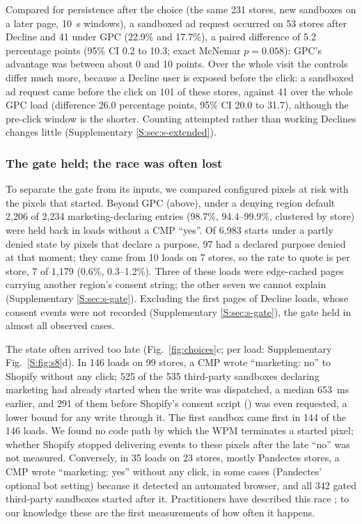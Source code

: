 Compared for persistence after the choice (the same 231 stores, new sandboxes on a later page, 10~s windows), a sandboxed ad request occurred on 53 stores after Decline and 41 under GPC (22.9\% and 17.7\%), a paired difference of 5.2 percentage points (95\% CI 0.2 to 10.3; exact McNemar $p=0.058$): GPC's advantage was between about 0 and 10 points. Over the whole visit the controls differ much more, because a Decline user is exposed before the click: a sandboxed ad request came before the click on 101 of these stores, against 41 over the whole GPC load (difference 26.0 percentage points, 95\% CI 20.0 to 31.7), although the pre-click window is the shorter. Counting attempted rather than working Declines changes little (Supplementary \ref*{S:sec:s-extended}).

\subsubsection{The gate held; the race was often lost}\label{sec:res-race}

To separate the gate from its inputs, we compared configured pixels at risk with the pixels that started. Beyond GPC (above), under a denying region default 2,206 of 2,234 marketing-declaring entries (98.7\%, 94.4--99.9\%, clustered by store) were held back in loads without a CMP ``yes''. Of 6,983 starts under a partly denied state by pixels that declare a purpose, 97 had a declared purpose denied at that moment; they came from 10 loads on 7 stores, so the rate to quote is per store, 7 of 1,179 (0.6\%, 0.3--1.2\%). Three of these loads were edge-cached pages carrying another region's consent string; the other seven we cannot explain (Supplementary \ref*{S:sec:s-gate}). Excluding the first pages of Decline loads, whose consent events were not recorded (Supplementary \ref*{S:sec:s-gate}), the gate held in almost all observed cases.

The state often arrived too late (Fig.~\ref{fig:choices}c; per load: Supplementary Fig.~\ref*{S:fig:s8}d). In 146 loads on 99 stores, a CMP wrote ``marketing: no'' to Shopify without any click; 525 of the 535 third-party sandboxes declaring marketing had already started when the write was dispatched, a median 653~ms earlier, and 291 of them before Shopify's consent script () was even requested, a lower bound for any write through it. The first sandbox came first in 144 of the 146 loads. We found no code path by which the WPM terminates a started pixel; whether Shopify stopped delivering events to these pixels after the late ``no'' was not measured. Conversely, in 35 loads on 23 stores, mostly Pandectes stores, a CMP wrote ``marketing: yes'' without any click, in some cases (Pandectes' optional bot setting) because it detected an automated browser, and all 342 gated third-party sandboxes started after it. Practitioners have described this race \citep{analyticsninja2025pixels,weltpixel2026race}; to our knowledge these are the first measurements of how often it happens.

